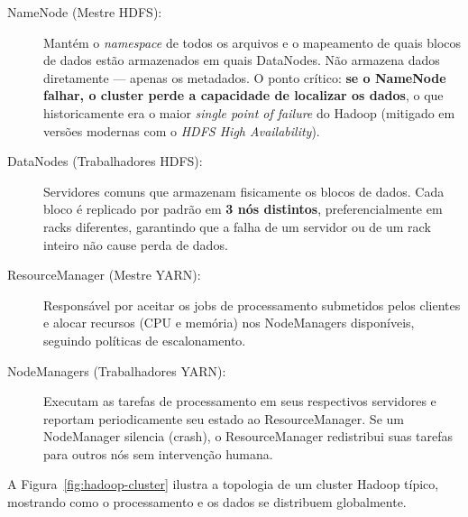 \documentclass[12pt,a4paper,twoside]{report}
\begin{document}
\begin{description}
    \item[NameNode (Mestre HDFS):] Mantém o \emph{namespace} de todos os
    arquivos e o mapeamento de quais blocos de dados estão armazenados em quais
    DataNodes. Não armazena dados diretamente --- apenas os metadados. O ponto
    crítico: \textbf{se o NameNode falhar, o cluster perde a capacidade de
    localizar os dados}, o que historicamente era o maior \textit{single point
    of failure} do Hadoop (mitigado em versões modernas com o \emph{HDFS High
    Availability}).
    \item[DataNodes (Trabalhadores HDFS):] Servidores comuns que armazenam
    fisicamente os blocos de dados. Cada bloco é replicado por padrão em
    \textbf{3 nós distintos}, preferencialmente em racks diferentes, garantindo
    que a falha de um servidor ou de um rack inteiro não cause perda de dados.
    \item[ResourceManager (Mestre YARN):] Responsável por aceitar os jobs de
    processamento submetidos pelos clientes e alocar recursos (CPU e memória)
    nos NodeManagers disponíveis, seguindo políticas de escalonamento.
    \item[NodeManagers (Trabalhadores YARN):] Executam as tarefas de
    processamento em seus respectivos servidores e reportam periodicamente seu
    estado ao ResourceManager. Se um NodeManager silencia (crash), o
    ResourceManager redistribui suas tarefas para outros nós sem intervenção
    humana.
\end{description}

A Figura~\ref{fig:hadoop-cluster} ilustra a topologia de um cluster Hadoop
típico, mostrando como o processamento e os dados se distribuem globalmente.
\end{document}
